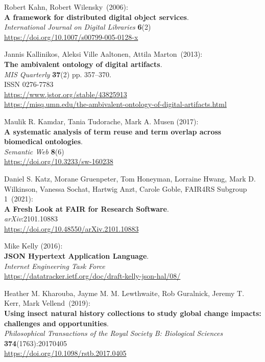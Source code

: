 \begin{thebibliography}{9}
Robert Kahn, Robert Wilensky~(2006):\\
\textbf{A framework for distributed digital object services}.\\
\emph{International Journal on Digital Libraries} \textbf{6}(2)\\
\url{https://doi.org/10.1007/s00799-005-0128-x}

Jannis Kallinikos, Aleksi Ville Aaltonen, Attila Marton~(2013):\\
\textbf{The ambivalent ontology of digital artifacts}.\\ 
\emph{MIS Quarterly} \textbf{37}(2) pp. 357--370.\\
ISSN 0276-7783\\
\url{https://www.jstor.org/stable/43825913}\\
\url{https://misq.umn.edu/the-ambivalent-ontology-of-digital-artifacts.html}

Maulik R. Kamdar, Tania Tudorache, Mark A. Musen (2017): \\
\textbf{A systematic analysis of term reuse and term overlap across biomedical ontologies}. \\
\emph{Semantic Web} \textbf{8}(6) \\
\url{https://doi.org/10.3233/sw-160238}

Daniel S. Katz, Morane Gruenpeter, Tom Honeyman, Lorraine Hwang,
Mark D. Wilkinson, Vanessa Sochat, Hartwig Anzt, Carole Goble, FAIR4RS
Subgroup 1~(2021):\\
\textbf{A Fresh Look at FAIR for Research Software}.\\
\emph{arXiv}:2101.10883\\
\url{https://doi.org/10.48550/arXiv.2101.10883}

Mike Kelly (2016): \\
\textbf{JSON Hypertext Application Language}.\\
\emph{Internet Engineering Task Force}\\
\url{https://datatracker.ietf.org/doc/draft-kelly-json-hal/08/}

Heather M. Kharouba, Jayme M. M. Lewthwaite, Rob Guralnick, Jeremy T. Kerr, Mark Vellend~(2019):\\
\textbf{Using insect natural history collections to study global change impacts: challenges and opportunities}.\\
\emph{Philosophical Transactions of the Royal Society B: Biological Sciences}
\textbf{374}(1763):20170405\\
\url{https://doi.org/10.1098/rstb.2017.0405}


\end{thebibliography}
